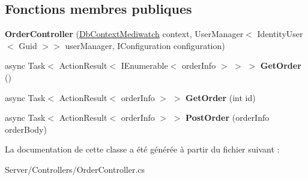 \subsection*{Fonctions membres publiques}
\begin{DoxyCompactItemize}
\item 
\mbox{\label{class_mediwatch_1_1_server_1_1_controllers_1_1_order_controller_aa02f49e23fa0e32bd7b3bcd7e78dbe95}} 
{\bfseries Order\+Controller} (\hyperlink{class_server_1_1_db_context_mediwatch}{Db\+Context\+Mediwatch} context, User\+Manager$<$ Identity\+User$<$ Guid $>$$>$ user\+Manager, I\+Configuration configuration)
\item 
\mbox{\label{class_mediwatch_1_1_server_1_1_controllers_1_1_order_controller_a977619eed4668581708a08aada1a9b9c}} 
async Task$<$ Action\+Result$<$ I\+Enumerable$<$ order\+Info $>$ $>$ $>$ {\bfseries Get\+Order} ()
\item 
\mbox{\label{class_mediwatch_1_1_server_1_1_controllers_1_1_order_controller_ad52f797fdca095d1abb72ef0b20d03cc}} 
async Task$<$ Action\+Result$<$ order\+Info $>$ $>$ {\bfseries Get\+Order} (int id)
\item 
\mbox{\label{class_mediwatch_1_1_server_1_1_controllers_1_1_order_controller_a40c08db38a82cf02eaf7c84acb05f169}} 
async Task$<$ Action\+Result$<$ order\+Info $>$ $>$ {\bfseries Post\+Order} (order\+Info order\+Body)
\end{DoxyCompactItemize}


La documentation de cette classe a été générée à partir du fichier suivant \+:\begin{DoxyCompactItemize}
\item 
Server/\+Controllers/Order\+Controller.\+cs\end{DoxyCompactItemize}
